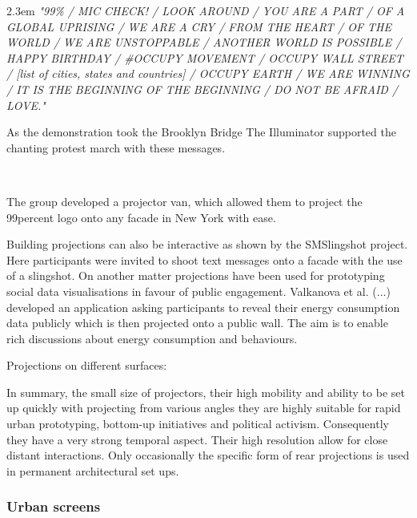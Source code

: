 
\begin{singlespace}
	\leftskip2.3em
		\rightskip\leftskip
\textit{\small "99\% / MIC CHECK! / LOOK AROUND / YOU ARE A PART / OF A GLOBAL UPRISING / WE ARE A CRY / FROM THE HEART / OF THE WORLD / WE ARE UNSTOPPABLE / ANOTHER WORLD IS POSSIBLE / HAPPY BIRTHDAY / \#OCCUPY MOVEMENT / OCCUPY WALL STREET / {[list of cities, states and countries]} / OCCUPY EARTH / WE ARE WINNING / IT IS THE BEGINNING OF THE BEGINNING / DO NOT BE AFRAID / LOVE."} 

\small As the demonstration took the Brooklyn Bridge The Illuminator supported the chanting protest march with these messages.
\end{singlespace}
\

The group developed a projector van, which allowed them to project the 99percent logo onto any facade in New York with ease.

Building projections can also be interactive as shown by the SMSlingshot project. Here participants were invited to shoot text messages onto a facade with the use of a slingshot.  
On another matter projections have been used for prototyping social data visualisations in favour of public engagement. Valkanova et al. (...) developed an application asking participants to reveal their energy consumption data publicly which is then projected onto a public wall. The aim is to enable rich discussions about energy consumption and behaviours.  

Projections on different surfaces: 

In summary, the small size of projectors, their high mobility and ability to be set up quickly with projecting from various angles they are highly suitable for rapid urban prototyping, bottom-up initiatives and political activism.  Consequently they have a very strong temporal aspect.
Their high resolution allow for close distant interactions.
Only occasionally the specific form of rear projections is used in permanent architectural set ups.


\subsubsection{Urban screens}

